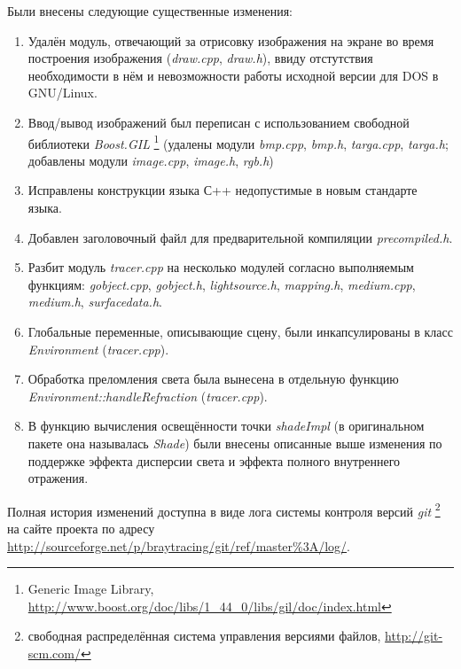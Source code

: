 \documentclass[a4paper,10pt]{article}
\begin{document}
Были внесены следующие существенные изменения:
\begin{enumerate}
  \item Удалён модуль, отвечающий за отрисовку изображения на экране во время построения изображения (\textit{draw.cpp}, \textit{draw.h}), 
  ввиду отстутствия необходимости в нём и невозможности работы исходной версии для DOS в GNU/Linux.
  \item Ввод/вывод изображений был переписан с использованием свободной библиотеки \textit{Boost.GIL}%
\footnote{Generic Image Library, \url{http://www.boost.org/doc/libs/1_44_0/libs/gil/doc/index.html}} 
(удалены модули \textit{bmp.cpp}, \textit{bmp.h}, \textit{targa.cpp}, \textit{targa.h}; 
добавлены модули \textit{image.cpp}, \textit{image.h}, \textit{rgb.h})
  \item Исправлены конструкции языка С++ недопустимые в новым стандарте языка.
  \item Добавлен заголовочный файл для предварительной компиляции \textit{precompiled.h}.
  \item Разбит модуль \textit{tracer.cpp} на несколько модулей согласно выполняемым функциям:
  \textit{gobject.cpp}, \textit{gobject.h}, \textit{lightsource.h}, \textit{mapping.h}, 
  \textit{medium.cpp}, \textit{medium.h}, \textit{surfacedata.h}.
  \item Глобальные переменные, описывающие сцену, были инкапсулированы в класс \textit{Environment} (\textit{tracer.cpp}).
  \item Обработка преломления света была вынесена в отдельную функцию \textit{Environment::handleRefraction} (\textit{tracer.cpp}).
  \item В функцию вычисления освещённости точки \textit{shadeImpl} (в оригинальном пакете она называлась \textit{Shade}) 
  были внесены описанные выше изменения по поддержке эффекта дисперсии света и эффекта полного внутреннего отражения.
\end{enumerate}
Полная история изменений доступна в виде лога системы контроля версий \textit{git}%
\footnote{свободная распределённая система управления версиями файлов, \url{http://git-scm.com/}}
на сайте проекта по адресу \url{http://sourceforge.net/p/braytracing/git/ref/master\%3A/log/}.
\end{document}
